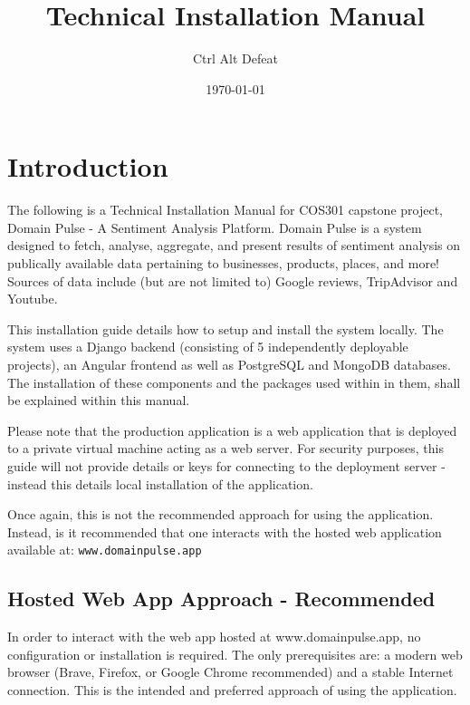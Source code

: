 \documentclass{article}
\title{Technical Installation Manual}
\author{Ctrl Alt Defeat}
\date{\today}
\newcommand{\code}[1]{\colorbox{light-gray}{\texttt{#1}}}
\begin{document}
\maketitle

\tableofcontents


\section{Introduction}
The following is a Technical Installation Manual for COS301 capstone project, Domain Pulse - A Sentiment Analysis Platform. Domain Pulse is
a system designed to fetch, analyse, aggregate, and present results of sentiment analysis on publically available data pertaining to
businesses, products, places, and more! Sources of data include (but are not limited to) Google reviews, TripAdvisor and Youtube.

This installation guide details how to setup and install the system locally. The system uses a Django backend (consisting of 5 independently deployable projects),
an Angular frontend as well as PostgreSQL and MongoDB databases. The installation of these components and the packages used within in
them, shall be explained within this manual.

Please note that the production application is a web application that is deployed to a private virtual machine acting as a web server. For
security purposes, this guide will not provide details or keys for connecting to the deployment server - instead this details local installation
of the application.

Once again, this is not the recommended approach for using the application. Instead, is it recommended that one interacts with the hosted web
application available at: \code{www.domainpulse.app}

\subsection{Hosted Web App Approach - Recommended}
In order to interact with the web app hosted at www.domainpulse.app, no configuration or installation is required. The only
prerequisites are: a modern web browser (Brave, Firefox, or Google Chrome recommended) and a stable Internet connection. This is the
intended and preferred approach of using the application.
\end{document}
